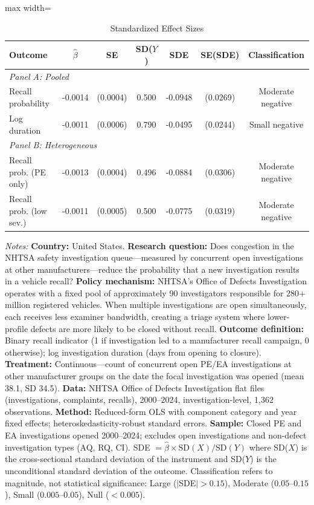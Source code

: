 \begin{table}[htbp]
\centering
\caption{Standardized Effect Sizes}
\label{tab:sde}
\begin{adjustbox}{max width=\textwidth}
\begin{tabular}{lcccccc}
\toprule
Outcome & $\hat{\beta}$ & SE & SD($Y$) & SDE & SE(SDE) & Classification \\
\midrule
\multicolumn{7}{l}{\textit{Panel A: Pooled}} \\[3pt]
Recall probability & -0.0014 & (0.0004) & 0.500 & -0.0948 & (0.0269) & Moderate negative \\
Log duration & -0.0011 & (0.0006) & 0.790 & -0.0495 & (0.0244) & Small negative \\
\midrule
\multicolumn{7}{l}{\textit{Panel B: Heterogeneous}} \\[3pt]
Recall prob. (PE only) & -0.0013 & (0.0004) & 0.496 & -0.0884 & (0.0306) & Moderate negative \\
Recall prob. (low sev.) & -0.0011 & (0.0005) & 0.500 & -0.0775 & (0.0319) & Moderate negative \\
\bottomrule
\end{tabular}
\end{adjustbox}
\par\vspace{0.3em}
{\scriptsize \textit{Notes:} \textbf{Country:} United States. \textbf{Research question:} Does congestion in the NHTSA safety investigation queue---measured by concurrent open investigations at other manufacturers---reduce the probability that a new investigation results in a vehicle recall? \textbf{Policy mechanism:} NHTSA's Office of Defects Investigation operates with a fixed pool of approximately 90 investigators responsible for 280+ million registered vehicles. When multiple investigations are open simultaneously, each receives less examiner bandwidth, creating a triage system where lower-profile defects are more likely to be closed without recall. \textbf{Outcome definition:} Binary recall indicator (1 if investigation led to a manufacturer recall campaign, 0 otherwise); log investigation duration (days from opening to closure). \textbf{Treatment:} Continuous---count of concurrent open PE/EA investigations at other manufacturer groups on the date the focal investigation was opened (mean 38.1, SD 34.5). \textbf{Data:} NHTSA Office of Defects Investigation flat files (investigations, complaints, recalls), 2000--2024, investigation-level, 1,362 observations. \textbf{Method:} Reduced-form OLS with component category and year fixed effects; heteroskedasticity-robust standard errors. \textbf{Sample:} Closed PE and EA investigations opened 2000--2024; excludes open investigations and non-defect investigation types (AQ, RQ, CI). SDE $= \hat{\beta} \times \text{SD}(X) / \text{SD}(Y)$ where SD($X$) is the cross-sectional standard deviation of the instrument and SD($Y$) is the unconditional standard deviation of the outcome. Classification refers to magnitude, not statistical significance: Large ($|$SDE$| > 0.15$), Moderate ($0.05$--$0.15$), Small ($0.005$--$0.05$), Null ($< 0.005$).}
\end{table}
